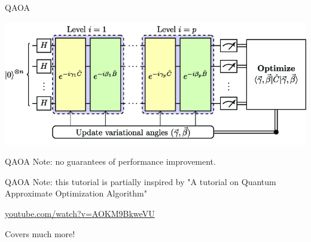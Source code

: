 \begin{frame}{QAOA}
\begin{center}
    \includegraphics[width=\textwidth]{img/lec6/qaoa.png}
\end{center}
\end{frame}


\begin{frame}{QAOA}
\alert{Note}: no guarantees of performance improvement. 
\end{frame}


\begin{frame}{QAOA}
\alert{Note}: this tutorial is partially inspired by "A tutorial on Quantum Approximate Optimization Algorithm" 

\bigskip\begin{center}\url{youtube.com/watch?v=AOKM9BkweVU}\end{center}

\bigskip Covers much more!
\end{frame}